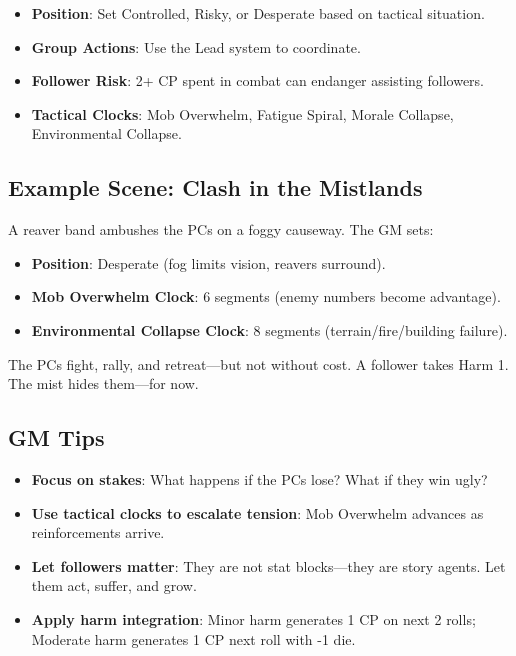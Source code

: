 \begin{itemize}
    \item \textbf{Position}: Set Controlled, Risky, or Desperate based on tactical situation.
    \item \textbf{Group Actions}: Use the Lead system to coordinate.
    \item \textbf{Follower Risk}: 2+ CP spent in combat can endanger assisting followers.
    \item \textbf{Tactical Clocks}: Mob Overwhelm, Fatigue Spiral, Morale Collapse, Environmental Collapse.
\end{itemize}

\subsection*{Example Scene: Clash in the Mistlands}

A reaver band ambushes the PCs on a foggy causeway. The GM sets:

\begin{itemize}
    \item \textbf{Position}: Desperate (fog limits vision, reavers surround).
    \item \textbf{Mob Overwhelm Clock}: 6 segments (enemy numbers become advantage).
    \item \textbf{Environmental Collapse Clock}: 8 segments (terrain/fire/building failure).
\end{itemize}

The PCs fight, rally, and retreat---but not without cost. A follower takes Harm 1. The mist hides them---for now.

\subsection*{GM Tips}

\begin{itemize}
    \item \textbf{Focus on stakes}: What happens if the PCs lose? What if they win ugly?
    \item \textbf{Use tactical clocks to escalate tension}: Mob Overwhelm advances as reinforcements arrive.
    \item \textbf{Let followers matter}: They are not stat blocks---they are story agents. Let them act, suffer, and grow.
    \item \textbf{Apply harm integration}: Minor harm generates 1 CP on next 2 rolls; Moderate harm generates 1 CP next roll with -1 die.
\end{itemize}


